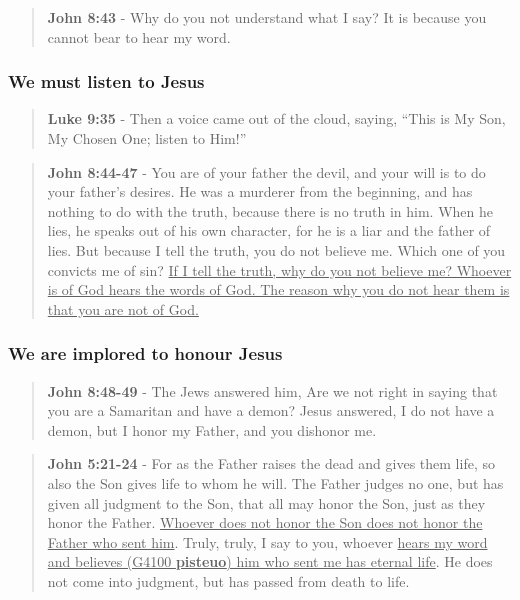\documentclass[11pt]{article}
\begin{document}
\begin{quote}
\textbf{John 8:43} - Why do you not understand what I say? It is because you cannot bear to hear my word.
\end{quote}

\subsubsection{We must listen to Jesus}
\label{sec:orgc7ff7a4}
\begin{quote}
\textbf{Luke 9:35} - Then a voice came out of the cloud, saying, “This is My Son, My Chosen One; listen to Him!”
\end{quote}

\begin{quote}
\textbf{John 8:44-47} - You are of your father the devil, and your will is to do your father's desires. He was a murderer from the beginning, and has nothing to do with the truth, because there is no truth in him. When he lies, he speaks out of his own character, for he is a liar and the father of lies. But because I tell the truth, you do not believe me. Which one of you convicts me of sin? \uline{If I tell the truth, why do you not believe me? Whoever is of God hears the words of God. The reason why you do not hear them is that you are not of God.}
\end{quote}

\subsubsection{We are implored to honour Jesus}
\label{sec:orgbc616c5}
\begin{quote}
\textbf{John 8:48-49} - The Jews answered him, Are we not right in saying that you are a Samaritan and have a demon? Jesus answered, I do not have a demon, but I honor my Father, and you dishonor me.
\end{quote}

\begin{quote}
\textbf{John 5:21-24} - For as the Father raises the dead and gives them life, so also the Son gives life to whom he will. The Father judges no one, but has given all judgment to the Son, that all may honor the Son, just as they honor the Father. \uline{Whoever does not honor the Son does not honor the Father who sent him}. Truly, truly, I say to you, whoever \uline{hears my word and believes (G4100 \textbf{pisteuo}) him who sent me has eternal life}. He does not come into judgment, but has passed from death to life.
\end{quote}
\end{document}
